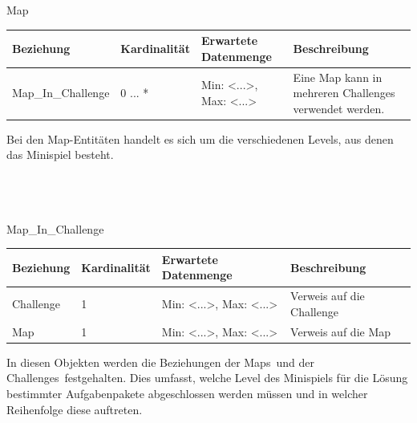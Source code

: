 \begin{entity}{40}{Map}
\begin{center}
	\begin{longtable}{|m{4cm}|m{}|m{}|m{}|}
 	 \hline
 	 \textbf{Beziehung} & \textbf{Kardinalität} &  \textbf{Erwartete Datenmenge} & \textbf{Beschreibung} \\
  	\hline
  	Map\_In\_Challenge & 0 ... *   & Min: <...>, Max: <...> & Eine Map kann in mehreren Challenges verwendet werden.\\
	  \hline
	\end{longtable}
\end{center}
Bei den \glqq Map\grqq-Entitäten handelt es sich um die verschiedenen Levels, aus denen das Minispiel besteht. \\\\\\\
\end{entity}

\begin{entity}{50}{Map\_In\_Challenge}
\begin{center}
	\begin{longtable}{|m{4cm}|m{}|m{}|m{}|}
 	 \hline
 	 \textbf{Beziehung} & \textbf{Kardinalität} &  \textbf{Erwartete Datenmenge} & \textbf{Beschreibung} \\
  	\hline
  	Challenge & 1  & Min: <...>, Max: <...> & Verweis auf die Challenge\\
	  \hline
  	Map & 1  & Min: <...>, Max: <...> & Verweis auf die Map\\
	  \hline
	\end{longtable}
\end{center}
In diesen Objekten werden die Beziehungen der \glqq Maps\grqq~und der \glqq Challenges\grqq~festgehalten. Dies umfasst, welche Level des Minispiels für die Lösung bestimmter Aufgabenpakete abgeschlossen werden müssen und in welcher Reihenfolge diese auftreten. \\\
\end{entity}


